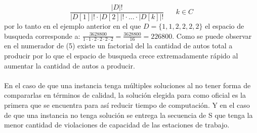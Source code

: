 \documentclass[letter, 10pt]{article}
\begin{document}
\begin{equation}
    \frac{|D|!}{|D[1]|!\cdot|D[2]|!\cdot...\cdot|D[k]|!}\hspace{20pt}k \in C 
\end{equation}
por lo tanto en el ejemplo anterior en el que $D = \{1,1,2,2,2,2\}$ el espacio de busqueda corresponde a: $\frac{3628800}{1\cdot1\cdot2\cdot2\cdot2\cdot2} = \frac{3628800}{16} = 226800$. Como se puede observar en el numerador de (5) existe un factorial del la cantidad de autos total a producir por lo que el espacio de busqueda crece extremadamente r\'apido al aumentar la cantidad de autos a producir.\\\\
En el caso de que una instancia tenga m\'ultiples soluciones al no tener forma de compararlas en t\'erminos de calidad, la soluci\'on elegida para como oficial es la primera que se encuentra para as\'i reducir tiempo de computaci\'on. Y en el caso de que una instancia no tenga soluci\'on se entrega la secuencia de S que tenga la menor cantidad de violaciones de capacidad de las estaciones de trabajo.
\end{document}

